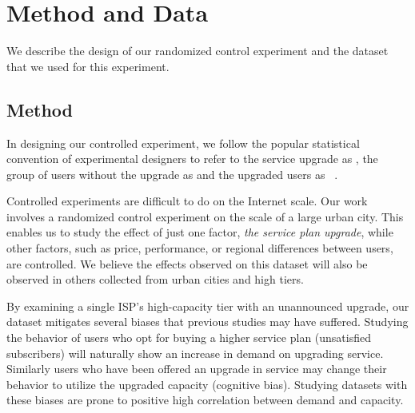 \section{Method and Data}\label{sec:data}

We describe the design of our randomized control experiment and the
dataset that we used for this experiment.

\subsection{Method}

In designing our controlled experiment, we follow the popular
statistical convention of experimental designers to refer to the service
upgrade as \factor{}, the group of users without the upgrade as
\control{} and the upgraded users as \treatment{}~\cite{stats-design}.

Controlled experiments are difficult to do on the Internet scale.  Our
work involves a randomized control experiment on the scale of a large
urban city. This enables us to study the effect of just one factor,
\emph{the service plan upgrade}, while other factors, such as price,
performance, or regional differences between users, are controlled. We
believe the effects observed on this dataset will also be observed in
others collected from urban cities and high tiers.

By examining a single ISP's high-capacity tier with an unannounced upgrade,
our dataset mitigates several biases that previous studies may have 
suffered. Studying the behavior of users who opt for buying a higher service plan
(unsatisfied subscribers) will naturally show an increase in demand on
upgrading service\cite{dasu-imc2014}.
Similarly users who have been offered an
upgrade in service may change their behavior to utilize the upgraded capacity
(cognitive bias)\cite{zheleva2013}. Studying datasets with these biases are prone 
to positive high correlation between demand and capacity. 


